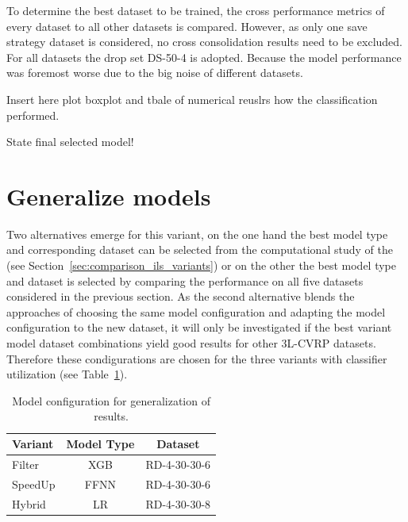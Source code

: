 To determine the best dataset to be trained, the cross performance metrics of every dataset to all other datasets is compared. However,
as only one save strategy dataset is considered, no cross consolidation results need to be excluded. For all datasets the drop set
DS-50-4 is adopted. Because the model performance was foremost worse due to the big noise of different datasets.

\parbreak

Insert here plot boxplot and tbale of numerical reuslrs how the classification performed.

\parbreak
State final selected model!

\section{Generalize \gendreauDataSetText models}
\label{sec:krebs_data_pretrained_models}

Two alternatives emerge for this variant, on the one hand the best model type and corresponding dataset can be selected from the
computational study of the \gendreauDataSetText (see Section~\ref{sec:comparison_ils_variants}) or on the other the best model type
and dataset is selected by comparing the performance on all five datasets considered in the previous section.
As the second alternative blends the approaches of choosing the same model configuration and adapting the model configuration
to the new dataset, it will only be investigated if the best variant model dataset combinations yield good results for other
\gls{3L-CVRP} datasets. Therefore these condigurations are chosen for the three variants with classifier utilization (see Table~\ref{tab:model_configuration_krebs}).

\begin{table}[ht]
    \centering
    \begin{tabular}{l c c  }
        \toprule
        Variant & Model Type & Dataset      \\
        \midrule
        Filter  & XGB        & RD-4-30-30-6 \\
        SpeedUp & FFNN       & RD-4-30-30-6 \\
        Hybrid  & LR         & RD-4-30-30-8 \\

        \bottomrule
    \end{tabular}
    \caption{Model configuration for generalization of \gendreauDataSetText results.}
    \label{tab:model_configuration_krebs}
\end{table}


